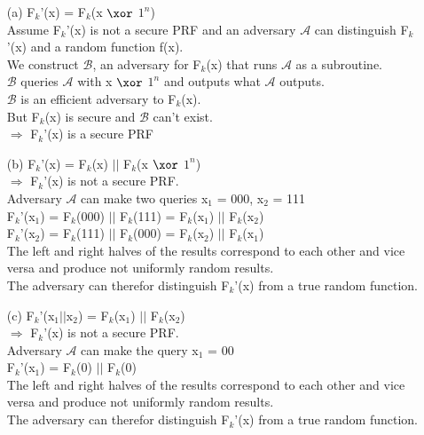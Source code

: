 \begin{itemize}
\item[(a)]
	F\(_{k}\)'(x) = F\(_{k}\)(x  \(\xor\)  \(1^{n}\)) \\
	Assume F\(_{k}\)'(x) is not a secure PRF and an adversary \(\mathcal{A}\) can distinguish F\(_{k}\)'(x) and a random function f(x).\\
	We construct \(\mathcal{B}\), an adversary for F\(_{k}\)(x) that runs \(\mathcal{A}\) as a subroutine.\\
	\(\mathcal{B}\) queries \(\mathcal{A}\) with x  \(\xor\)  \(1^{n}\) and outputs what \(\mathcal{A}\) %
	outputs.\\
	\(\mathcal{B}\) is an efficient adversary to  F\(_{k}\)(x).\\
	But  F\(_{k}\)(x) is secure and \(\mathcal{B}\)  can't exist. \\
	\(\Rightarrow\) F\(_{k}\)'(x) is a secure PRF \\

\item[(b)]
	F\(_{k}\)'(x) =  F\(_{k}\)(x) \(\vert \vert\) F\(_{k}\)(x  \(\xor\)  \(1^{n}\)) \\
	\(\Rightarrow\) F\(_{k}\)'(x) is not a secure PRF.\\
	Adversary \(\mathcal{A}\) can make two queries x\(_{1}\) = 000, x\(_{2}\) = 111 \\
	F\(_{k}\)'(x\(_{1}\)) = F\(_{k}\)(000)  \(\vert \vert\) F\(_{k}\)(111) = F\(_{k}\)(x\(_{1}\))  \(\vert \vert\) F\(_{k}\)(x\(_{2}\)) \\
	F\(_{k}\)'(x\(_{2}\)) = F\(_{k}\)(111)  \(\vert \vert\) F\(_{k}\)(000) = F\(_{k}\)(x\(_{2}\))  \(\vert \vert\) F\(_{k}\)(x\(_{1}\)) \\
	The left and right halves of the results correspond to each other and vice versa and produce not uniformly random results.\\
	The adversary can therefor distinguish F\(_{k}\)'(x) from a true random function.\\
	
\item[(c)]
	F\(_{k}\)'(x\(_{1}\)\(\vert \vert\)x\(_{2}\)) =  F\(_{k}\)(x\(_{1}\)) \(\vert \vert\) F\(_{k}\)(x\(_{2}\)) \\
	\(\Rightarrow\) F\(_{k}\)'(x) is not a secure PRF.\\
	Adversary \(\mathcal{A}\) can make the query x\(_{1}\) = 00 \\
	F\(_{k}\)'(x\(_{1}\)) =  F\(_{k}\)(0) \(\vert \vert\) F\(_{k}\)(0) \\
	The left and right halves of the results correspond to each other and vice versa and produce not uniformly random results.\\
	The adversary can therefor distinguish F\(_{k}\)'(x) from a true random function.\\


\end{itemize}
